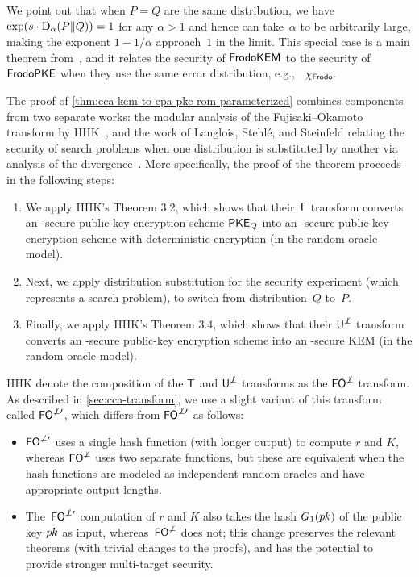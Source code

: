 \documentclass{iacrcc}
\begin{document}
We point out that when $P=Q$ are the same distribution, we have
$\exp(s \cdot \mathrm{D}_{\alpha}(P \| Q)) = 1$ for any $\alpha > 1$ and
hence can take~$\alpha$ to be arbitrarily large, making the exponent
$1-1/\alpha$ approach~$1$ in the limit. This special case is a main
theorem from~\cite{TCC:HofHovKil17}, and it relates the \INDCCA
security of $\textsf{\upshape\mdseries FrodoKEM}$ to the \INDCPA security of $\textsf{\upshape\mdseries FrodoPKE}$ when
they use the same error distribution, e.g., ~$\chi_{\textsf{\upshape\mdseries Frodo}}$.

The proof of \autoref{thm:cca-kem-to-cpa-pke-rom-parameterized}
combines components from two separate works: the modular analysis of
the Fujisaki--Okamoto transform by HHK~\cite{TCC:HofHovKil17}, and the
work of Langlois, Stehl{\' e}, and Steinfeld relating the security of
search problems when one distribution is substituted by another via
analysis of the \renyi divergence~\cite{EC:LanSteSte14}.  More
specifically, the proof of the theorem proceeds in the following
steps:
\begin{enumerate}
\item We apply HHK's Theorem 3.2, which shows that their $\textsf{\upshape\mdseries T}$
  transform converts an \INDCPA-secure public-key encryption scheme
  $\textsf{\upshape\mdseries PKE}_{Q}$ into an \OWPCA-secure public-key encryption scheme with
  deterministic encryption (in the random oracle model).
\item Next, we apply distribution substitution for the \OWPCA security
  experiment (which represents a search problem), to switch from
  distribution~$Q$ to~$P$.
\item Finally, we apply HHK's Theorem 3.4, which shows that their
  $\textsf{\upshape\mdseries U}^{\not\perp}$ transform converts an \OWPCA-secure public-key
  encryption scheme into an \INDCCA-secure KEM (in the random oracle
  model).
\end{enumerate}

HHK denote the composition of the $\textsf{\upshape\mdseries T}$ and $\textsf{\upshape\mdseries U}^{\not\perp}$ transforms as
the $\textsf{\upshape\mdseries FO}^{\not\perp}$ transform.  As described in
\autoref{sec:cca-transform}, we use a slight variant of this
transform called $\textsf{\upshape\mdseries FO}^{\not\perp\prime}$, which differs from
$\textsf{\upshape\mdseries FO}^{\not\perp\prime}$ as follows:
\begin{itemize}
\item $\textsf{\upshape\mdseries FO}^{\not\perp\prime}$ uses a single hash function (with longer
  output) to compute $r$ and $K$, whereas $\textsf{\upshape\mdseries FO}^{\not\perp}$ uses two
  separate functions, but these are equivalent when the hash functions
  are modeled as independent random oracles and have appropriate
  output lengths.
\item The~$\textsf{\upshape\mdseries FO}^{\not\perp\prime}$ computation of $r$ and $K$ also takes the
  hash $G_1(p\mkern-0.5muk)$ of the public key $p\mkern-0.5muk$ as input,
  whereas~$\textsf{\upshape\mdseries FO}^{\not\perp}$ does not; this change preserves the relevant
  theorems (with trivial changes to the proofs), and has the potential
  to provide stronger multi-target security.
\end{itemize}
\end{document}
